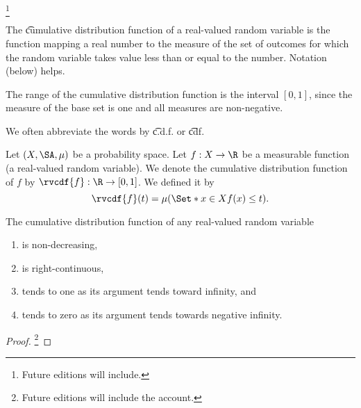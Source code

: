 
\footnote{Future editions will include.}



The \t{cumulative distribution function} of a real-valued random variable is the function mapping a real number to the measure of the set of outcomes for which the random variable takes value less than or equal to the number.
Notation (below) helps.

The range of the cumulative distribution function is the interval $[0, 1]$, since the measure of the base set is one and all measures are non-negative.

We often abbreviate the words  by \t{c.d.f.} or \t{cdf}.


Let $(X, \SA, \mu)$ be a probability space.
Let $f: X \to \R$ be a measurable function (a real-valued random variable).
We denote the cumulative distribution function of $f$ by $\rvcdf{f}: \R \to [0, 1]$.
We defined it by
\[
  \rvcdf{f}(t) = \mu(\Set*{x \in X}{f(x) \leq t}).
\]


\begin{prop}
The cumulative distribution function
of any real-valued random variable
\begin{enumerate}

  \item
    is non-decreasing,

  \item
    is right-continuous,

  \item
    tends to one as its argument
    tends toward infinity, and

  \item
    tends to zero as its argument
    tends towards negative infinity.
\end{enumerate}
  \begin{proof}\footnote{Future editions will include the account.}
  \end{proof}
\end{prop}

